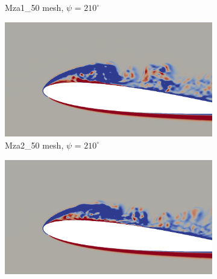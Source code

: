 \begin{figure}[H]
\begin{subfigure}[b]{0.475\textwidth}
		\caption{Mza1\_50 mesh, $\psi$ = $210^\circ$}
		\label{fig:Mza1_50_sp_psi210}
	\end{subfigure}
	\begin{subfigure}[b]{0.475\textwidth}
		\centering
		\includegraphics[width=1\textwidth]{figures/zonal_adapt_results/vorticity_plots/v2/Mza2_50/spavg/phase_210.png}
		\caption{Mza2\_50 mesh, $\psi$ = $210^\circ$}
		\label{fig:Mza2_50_sp_psi210}
	\end{subfigure}	
	\begin{subfigure}[b]{0.475\textwidth}
		\centering
		\includegraphics[width=1\textwidth]{figures/zonal_adapt_results/vorticity_plots/v2/Mza2_100/spavg/phase_210.png}

\end{subfigure}
\end{figure}
